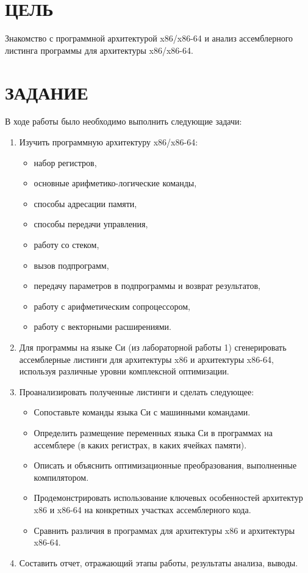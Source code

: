 \documentclass[12pt,a4paper]{article}
\numberwithin{subsection}{section}
\begin{document}
\tableofcontents

\newpage

\setcounter{page}{2}


\section{ЦЕЛЬ}
Знакомство с программной архитектурой x86/x86-64 и анализ ассемблерного 
листинга программы для архитектуры x86/x86-64.


\section{ЗАДАНИЕ}
В ходе работы было необходимо выполнить следующие задачи:
\begin{enumerate}
    \item Изучить программную архитектуру x86/x86-64:
    \begin{itemize}
        \item набор регистров,
        \item основные арифметико-логические команды,
        \item способы адресации памяти,
        \item способы передачи управления,
        \item работу со стеком,
        \item вызов подпрограмм,
        \item передачу параметров в подпрограммы и возврат результатов,
        \item работу с арифметическим сопроцессором, 
        \item работу с векторными расширениями. 
    \end{itemize}
    \item Для программы на языке Си (из лабораторной работы 1) сгенерировать 
    ассемблерные листинги для архитектуры x86 и архитектуры x86-64, 
    используя различные уровни комплексной оптимизации. 
    \item Проанализировать полученные листинги и сделать следующее:
    \begin{itemize}
        \item Сопоставьте команды языка Си с машинными командами. 
        \item Определить размещение переменных языка Си в программах
        на ассемблере (в каких регистрах, в каких ячейках памяти). 
        \item Описать и объяснить оптимизационные преобразования, 
        выполненные компилятором.
        \item Продемонстрировать использование ключевых особенностей
        архитектур x86 и x86-64 на конкретных участках ассемблерного кода. 
        \item Сравнить различия в программах для архитектуры x86 и 
        архитектуры x86-64.
    \end{itemize}
    \item Составить отчет, отражающий этапы работы, результаты анализа, выводы.
\end{enumerate}
\end{document}
